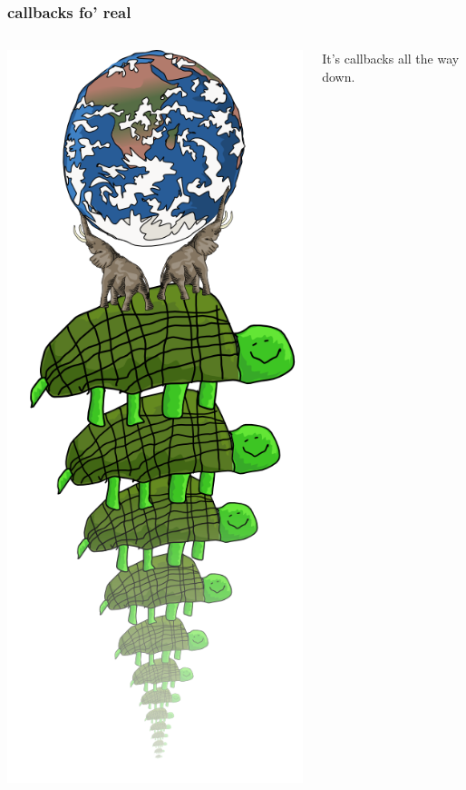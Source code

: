 \documentclass{beamer}
\begin{document}
\begin{frame}
    \frametitle{callbacks fo' real}
    \begin{columns}[c]
        \includegraphics[scale=0.28]{images/all_the_way_down.png}
        \begin{center}
        \fbox{}
        \newline
        
        \pause
        \huge
        It's callbacks all the way down.
        
        \end{center}
    \end{columns}
\end{frame}
\end{document}

